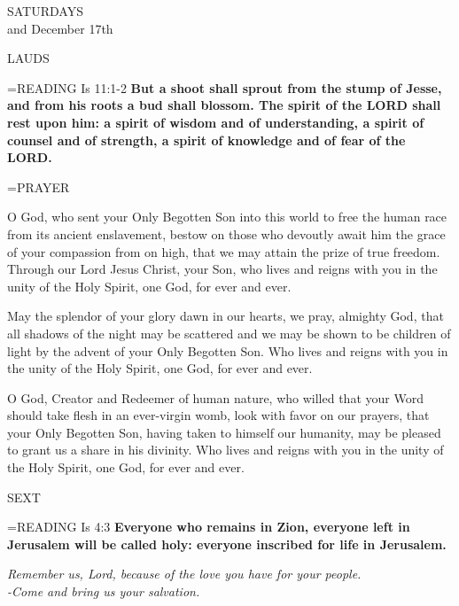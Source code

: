 \begin{center}\normalsize SATURDAYS\\
\footnotesize and December 17th\\
\end{center}

\begin{flushleft}\normalsize LAUDS\\\end{flushleft}

\hangindent=\parindent \small{\uppercase{READING}} Is 11:1-2 \textbf{But a shoot shall sprout from the stump of Jesse, and from his roots a bud shall blossom. The spirit of the LORD shall rest upon him: a spirit of wisdom and of understanding, a spirit of counsel and of strength, a spirit of knowledge and of fear of the LORD.\\}

\hangindent=\parindent \small PRAYER
\begin{description}[labelindent=\parindent, leftmargin=*]
\item [Week 1:]  O God, who sent your Only Begotten Son into this world to free the human race from its ancient enslavement, bestow on those who devoutly await him the grace of your compassion from on high, that we may attain the prize of true freedom. Through our Lord Jesus Christ, your Son, who lives and reigns with you in the unity of the Holy Spirit, one God, for ever and ever.
\item [Week 2:]  May the splendor of your glory dawn in our hearts, we pray, almighty God, that all shadows of the night may be scattered and we may be shown to be children of light by the advent of your Only Begotten Son. Who lives and reigns with you in the unity of the Holy Spirit, one God, for ever and ever.
\item [December 17th:]  O God, Creator and Redeemer of human nature, who willed that your Word should take flesh in an ever-virgin womb, look with favor on our prayers, that your Only Begotten Son, having taken to himself our humanity, may be pleased to grant us a share in his divinity. Who lives and reigns with you in the unity of the Holy Spirit, one God, for ever and ever.
\end{description}

\begin{flushleft}\normalsize SEXT\\\end{flushleft}

\hangindent=\parindent \small{\uppercase{READING}} Is 4:3 \textbf{Everyone who remains in Zion, everyone left in Jerusalem will be called holy: everyone inscribed for life in Jerusalem.\\}

\begin{center}
\textit{Remember us, Lord, because of the love you have for your people.\\
-Come and bring us your salvation.}
\end{center}

